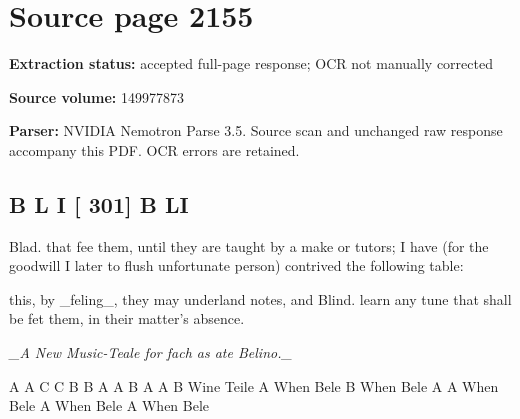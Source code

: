 \clearpage
\section{Source page 2155}
\textbf{Extraction status:} accepted full-page response; OCR not manually corrected\par
\textbf{Source volume:} 149977873\par
\textbf{Parser:} NVIDIA Nemotron Parse 3.5. Source scan and unchanged raw response accompany this PDF. OCR errors are retained.\par\medskip
\subsection*{B L I [ 301] B LI}
Blad. that fee them, until they are taught by a make or tutors; I have (for the goodwill I later to flush unfortunate person) contrived the following table:\par\medskip
this, by \_feling\_, they may underland notes, and Blind.
learn any tune that shall be fet them, in their matter’s absence.\par\medskip
{\small\itshape \_A New Music-Teale for fach as ate Belino.\_\par}\medskip
A
A
C
C
B
B
A
A
B
A
A
B
Wine Teile
A
When Bele
B
When Bele
A
A
When Bele
A
When Bele
A
When Bele\par\medskip
